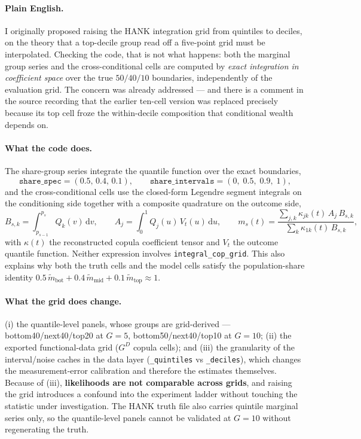 \documentclass[11pt]{article}
\begin{document}
\paragraph{Plain English.} I originally proposed raising the HANK integration
grid from quintiles to deciles, on the theory that a top-decile group read off a
five-point grid must be interpolated. Checking the code, that is not what
happens: both the marginal group series and the cross-conditional cells are
computed by \emph{exact integration in coefficient space} over the true
$50/40/10$ boundaries, independently of the evaluation grid. The concern was
already addressed --- and there is a comment in the source recording that the
earlier ten-cell version was replaced precisely because its top cell froze the
within-decile composition that conditional wealth depends on.

\paragraph{What the code does.} The share-group series integrate the quantile
function over the exact boundaries,
\begin{equation}
  \texttt{share\_spec} = (0.5,\,0.4,\,0.1),
  \qquad
  \texttt{share\_intervals} = (0,\; 0.5,\; 0.9,\; 1),
\end{equation}
and the cross-conditional cells use the closed-form Legendre segment integrals
on the conditioning side together with a composite quadrature on the outcome
side,
\begin{equation}
  B_{s,k} = \int_{p_{s-1}}^{p_s} Q_k(v)\,\mathrm{d}v,
  \qquad
  A_j = \int_0^1 Q_j(u)\, V_t(u)\,\mathrm{d}u,
  \qquad
  m_s(t) = \frac{\sum_{j,k} \kappa_{jk}(t)\, A_j\, B_{s,k}}{\sum_k \kappa_{1k}(t)\, B_{s,k}},
\end{equation}
with $\kappa(t)$ the reconstructed copula coefficient tensor and $V_t$ the
outcome quantile function. Neither expression involves
\texttt{integral\_cop\_grid}. This also explains why both the truth cells and
the model cells satisfy the population-share identity
$0.5\,\tilde m_{\text{bot}} + 0.4\,\tilde m_{\text{mid}} + 0.1\,\tilde m_{\text{top}} \approx 1$.

\paragraph{What the grid does change.} (i) the quantile-level panels, whose
groups are grid-derived --- bottom40/next40/top20 at $G=5$, bottom50/next40/top10
at $G=10$; (ii) the exported functional-data grid ($G^D$ copula cells); and
(iii) the granularity of the interval/noise caches in the data layer
(\texttt{\_quintiles} vs \texttt{\_deciles}), which changes the
measurement-error calibration and therefore the estimates themselves. Because of
(iii), \textbf{likelihoods are not comparable across grids}, and raising the
grid introduces a confound into the experiment ladder without touching the
statistic under investigation. The HANK truth file also carries quintile
marginal series only, so the quantile-level panels cannot be validated at
$G=10$ without regenerating the truth.
\end{document}
